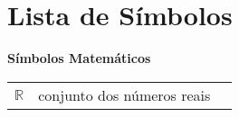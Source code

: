 
\chapter*{Lista de Símbolos}

\begin{spacing}{1.45}

\noindent \textbf{Símbolos Matemáticos}

\begin{longtable}{L{1.5cm}L{14cm}L{\textwidth}}

$\mathbb{R}$ & conjunto dos números reais & \\



\end{longtable}

\end{spacing}
